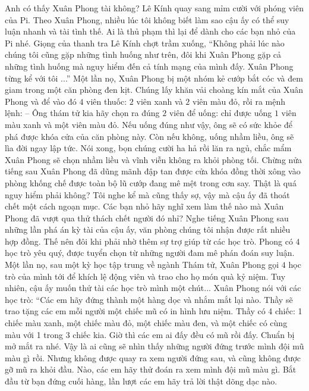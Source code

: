 	\vskip 0.1cm
	Anh có thấy Xuân Phong tài không? Lê Kính quay sang mỉm cười với phóng viên của Pi. Theo Xuân Phong, nhiều lúc tôi không biết làm sao cậu ấy có thể suy luận nhanh và tài tình thế. Ai là thủ phạm thì lại để dành cho các bạn nhỏ của Pi nhé.
	\vskip 0.1cm
	Giọng của thanh tra Lê Kính chợt trầm xuống, “Không phải lúc nào chúng tôi cũng gặp những tình huống như trên, đôi khi Xuân Phong gặp cả những tình huống mà nguy hiểm đến cả tính mạng của mình đấy. Xuân Phong từng kể với tôi ...”
	\vskip 0.1cm
	{\color{toanhocdoisong}{THỬ THÁCH SỐNG CÒN}}
	\vskip 0.1cm 
	Một lần nọ, Xuân Phong bị một nhóm kẻ cướp bắt cóc và đem giam trong một căn phòng đen kịt. Chúng lấy khăn vải choàng kín mắt của Xuân Phong và để vào đó $4$ viên thuốc: $2$ viên xanh và $2$ viên màu đỏ, rồi ra mệnh lệnh:
	\vskip 0.1cm
	--	Ông thám tử kia hãy chọn ra đúng $2$ viên để uống: chỉ được uống $1$ viên màu xanh và một viên màu đỏ. Nếu uống đúng như vậy, ông sẽ có sức khỏe để phá được khóa cửa của căn phòng này. Còn nếu không, uống nhầm liều, ông sẽ lìa đời ngay lập tức. 
	\vskip 0.1cm
	Nói xong, bọn chúng cười ha hả rồi lăn ra ngủ, chắc mẩm Xuân Phong sẽ chọn nhầm liều và vĩnh viễn không ra khỏi phòng tối. Chừng nửa tiếng sau Xuân Phong đã dũng mãnh đập tan được cửa khóa đồng thời xông vào phòng khống chế được toàn bộ lũ cướp đang mê mệt trong cơn say. 
	\vskip 0.1cm
	Thật là quá nguy hiểm phải không? Tôi nghe kể mà cũng thấy sợ, vậy mà cậu ấy đã thoát chết một cách ngoạn mục. Các bạn nhỏ hãy nghĩ xem làm thế nào mà Xuân Phong đã vượt qua thử thách chết người đó nhỉ? 
	\vskip 0.1cm
	Nghe tiếng Xuân Phong sau những lần phá án kỳ tài của cậu ấy, văn phòng chúng tôi nhận được rất nhiều hợp đồng. Thế nên đôi khi phải nhờ thêm sự trợ giúp từ các học trò. Phong có $4$ học trò yêu quý, được tuyển chọn từ những người đam mê phán đoán suy luận. Một lần nọ, sau một kỳ học tập trung về ngành Thám tử, Xuân Phong gọi $4$ học trò của mình tới để khích lệ động viên và trao cho họ món quà kỷ niệm. Tuy nhiên, cậu ấy muốn thử tài các học trò mình một chút...
	\vskip 0.1cm
	{\color{toanhocdoisong}{CHIẾC MŨ KỶ NIỆM}}
	\vskip 0.1cm
	Xuân Phong nói với các học trò: “Các em hãy đứng thành một hàng dọc và nhắm mắt lại nào. Thầy sẽ trao tặng các em mỗi người một chiếc mũ có in hình lưu niệm. Thầy có 4 chiếc: 1 chiếc màu xanh, một chiếc màu đỏ, một chiếc màu đen, và một chiếc có cùng màu với 1 trong 3 chiếc kia. Giờ thì các em ai đấy đều có mũ rồi đấy. Chuẩn bị mở mắt ra nhé. Vậy là ai cũng sẽ nhìn thấy những người đứng trước mình đội mũ màu gì rồi. Nhưng không được quay ra xem người đứng sau, và cũng không được gỡ mũ ra khỏi đầu. Nào, các em hãy thử đoán ra xem mình đội mũ màu gì. Bắt đầu từ bạn đứng cuối hàng, lần lượt các em hãy trả lời thật dõng dạc nào. 
